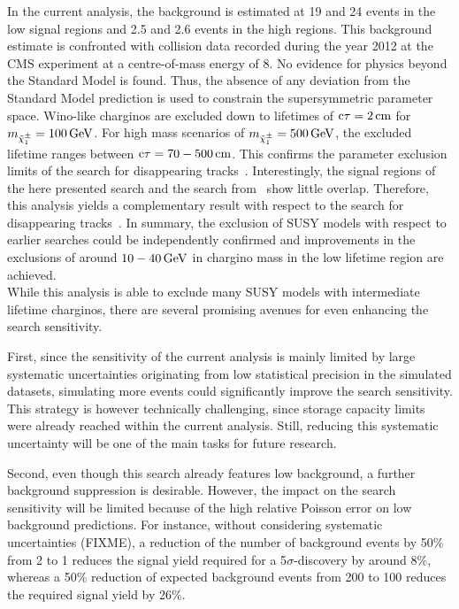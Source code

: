 In the current analysis, the background is estimated at 19 and 24 events in the low \ias signal regions and 2.5 and 2.6 events in the high \ias regions.
This background estimate is confronted with collision data recorded during the year 2012 at the CMS experiment at a centre-of-mass energy of 8\tev.
No evidence for physics beyond the Standard Model is found. %
Thus, the absence of any deviation from the Standard Model prediction is used to constrain the supersymmetric parameter space.
Wino-like charginos are excluded down to lifetimes of $\text{c}\tau=2\,\text{cm}$ for $m_{\tilde{\chi}^{\pm}_{1}}=100\,\text{Ge}\kern-0.06667em\text{V}$.
For high mass scenarios of $m_{\tilde{\chi}^{\pm}_{1}}=500\,\text{Ge}\kern-0.06667em\text{V}$, the excluded lifetime ranges between $\text{c}\tau=70-500\,\text{cm}$.
This confirms the parameter exclusion limits of the search for disappearing tracks~\cite{bib:CMS:DT_8TeV}.
Interestingly, the signal regions of the here presented search and the search from~\cite{bib:CMS:DT_8TeV} show little overlap.
Therefore, this analysis yields a complementary result with respect to the search for disappearing tracks~\cite{bib:CMS:DT_8TeV}.
In summary, the exclusion of SUSY models with respect to earlier searches could be independently confirmed and improvements in the exclusions of around $10-40\,\text{Ge}\kern-0.06667em\text{V}$ in chargino mass in the low lifetime region are achieved.\\


While this analysis is able to exclude many SUSY models with intermediate lifetime charginos, there are several promising avenues for even enhancing the search sensitivity.

First, since the sensitivity of the current analysis is mainly limited by large systematic uncertainties originating from low statistical precision in the simulated datasets, simulating more events could significantly improve the search sensitivity.
This strategy is however technically challenging, since storage capacity limits were already reached within the current analysis.
Still, reducing this systematic uncertainty will be one of the main tasks for future research.

Second, even though this search already features low background, a further background suppression is desirable.
However, the impact on the search sensitivity will be limited because of the high relative Poisson error on low background predictions.
For instance, without considering systematic uncertainties (FIXME), a reduction of the number of background events by 50\% from 2 to 1 reduces the signal yield required for a 5$\sigma$-discovery by around 8\%, whereas a 50\% reduction of expected background events from 200 to 100 reduces the required signal yield by 26\%.

